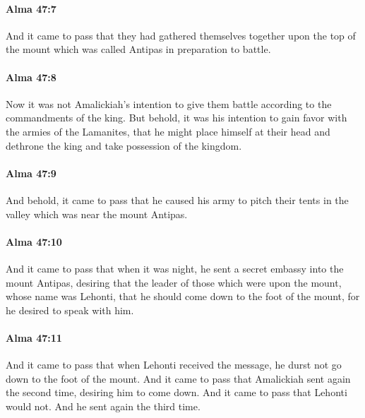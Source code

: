 		\paragraph{Alma 47:7} %
			\label{ALMA-47-7}

			And it came to pass that they had gathered themselves together
			upon the top of the mount which was called Antipas
			in preparation to battle.

		\paragraph{Alma 47:8} %
			\label{ALMA-47-8}

			Now it was not Amalickiah's intention
			to give them battle according to the commandments of the king.
			But behold, it was his intention to gain favor with the armies of the Lamanites,
			that he might place himself at their head
			and dethrone the king and take possession of the kingdom.

		\paragraph{Alma 47:9} %
			\label{ALMA-47-9}

			And behold, it came to pass that
			he caused his army to pitch their tents
			in the valley which was near the mount Antipas.

		\paragraph{Alma 47:10} %
			\label{ALMA-47-10}

			And it came to pass that when it was night,
			he sent a secret embassy into the mount Antipas,
			desiring that the leader of those which were upon the mount,
			whose name was Lehonti,
			that he should come down to the foot of the mount,
			for he desired to speak with him.

		\paragraph{Alma 47:11} %
			\label{ALMA-47-11}

			And it came to pass that when Lehonti received the message,
			he durst not go down to the foot of the mount.
			And it came to pass that Amalickiah sent again the second time,
			desiring him to come down.
			And it came to pass that Lehonti would not.
			And he sent again the third time.

